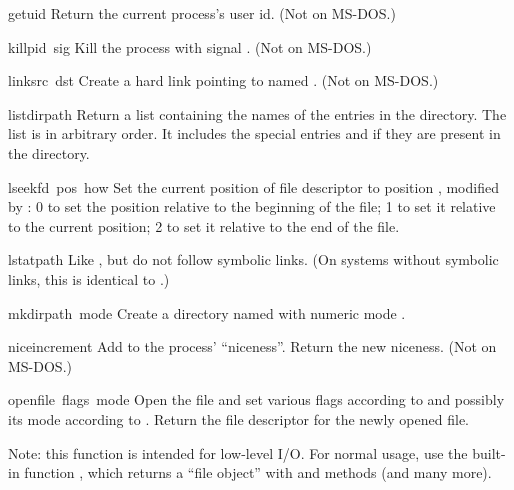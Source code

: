 \begin{funcdesc}{getuid}{}
Return the current process's user id.
(Not on MS-DOS.)
\end{funcdesc}

\begin{funcdesc}{kill}{pid\, sig}
Kill the process  with signal .
(Not on MS-DOS.)
\end{funcdesc}

\begin{funcdesc}{link}{src\, dst}
Create a hard link pointing to  named .
(Not on MS-DOS.)
\end{funcdesc}

\begin{funcdesc}{listdir}{path}
Return a list containing the names of the entries in the directory.
The list is in arbitrary order.  It includes the special entries
 and  if they are present in the directory.
\end{funcdesc}

\begin{funcdesc}{lseek}{fd\, pos\, how}
Set the current position of file descriptor  to position
, modified by : 0 to set the position relative to
the beginning of the file; 1 to set it relative to the current
position; 2 to set it relative to the end of the file.
\end{funcdesc}

\begin{funcdesc}{lstat}{path}
Like , but do not follow symbolic links.  (On systems
without symbolic links, this is identical to .)
\end{funcdesc}

\begin{funcdesc}{mkdir}{path\, mode}
Create a directory named  with numeric mode .
\end{funcdesc}

\begin{funcdesc}{nice}{increment}
Add  to the process' ``niceness''.  Return the new niceness.
(Not on MS-DOS.)
\end{funcdesc}

\begin{funcdesc}{open}{file\, flags\, mode}
Open the file  and set various flags according to
 and possibly its mode according to .
Return the file descriptor for the newly opened file.

Note: this function is intended for low-level I/O.  For normal usage,
use the built-in function , which returns a ``file object''
with  and   methods (and many more).
\end{funcdesc}

